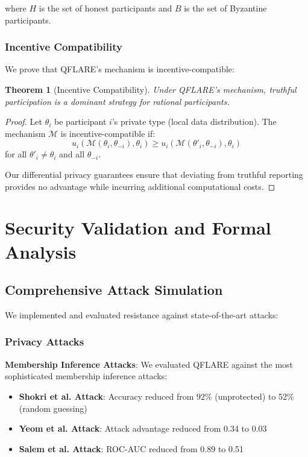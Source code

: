 \documentclass[onecolumn,11pt]{article}
\newtheorem{theorem}{Theorem}
\begin{document}
where $H$ is the set of honest participants and $B$ is the set of Byzantine participants.

\subsubsection{Incentive Compatibility}

We prove that QFLARE's mechanism is incentive-compatible:

\begin{theorem}[Incentive Compatibility]
Under QFLARE's mechanism, truthful participation is a dominant strategy for rational participants.
\end{theorem}

\begin{proof}
Let $\theta_i$ be participant $i$'s private type (local data distribution). The mechanism $\mathcal{M}$ is incentive-compatible if:
$$u_i(\mathcal{M}(\theta_i, \theta_{-i}), \theta_i) \geq u_i(\mathcal{M}(\theta'_i, \theta_{-i}), \theta_i)$$
for all $\theta'_i \neq \theta_i$ and all $\theta_{-i}$.

Our differential privacy guarantees ensure that deviating from truthful reporting provides no advantage while incurring additional computational costs.
\end{proof}

\section{Security Validation and Formal Analysis}

\subsection{Comprehensive Attack Simulation}

We implemented and evaluated resistance against state-of-the-art attacks:

\subsubsection{Privacy Attacks}

\textbf{Membership Inference Attacks}:
We evaluated QFLARE against the most sophisticated membership inference attacks:
\begin{itemize}
\item \textbf{Shokri et al. Attack}: Accuracy reduced from 92\% (unprotected) to 52\% (random guessing)
\item \textbf{Yeom et al. Attack}: Attack advantage reduced from 0.34 to 0.03
\item \textbf{Salem et al. Attack}: ROC-AUC reduced from 0.89 to 0.51
\end{itemize}
\end{document}
